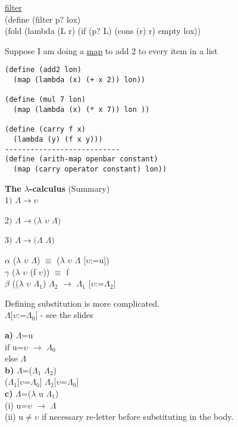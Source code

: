 \documentclass{article}
\begin{document}
\begin{flushleft}
\underline{filter}\\
(define (filter p? lox)\\
(fold (lambda (L r) (if (p? L) (cons (r) r) empty lox))\\
\end{flushleft}

\doublespacing
\begin{flushleft}
Suppose I am doing a \underline{map} to add 2 to every item in a list
\begin{verbatim}
(define (add2 lon)
  (map (lambda (x) (+ x 2)) lon))
  
(define (mul 7 lon)
  (map (lambda (x) (* x 7)) lon ))
  
(define (carry f x)
  (lambda (y) (f x y)))
---------------------------
(define (arith-map openbar constant)
  (map (carry operator constant) lon))
\end{verbatim}
\end{flushleft}

\begin{flushleft}
\textbf{The $\lambda$-calculus} (Summary)\\
$1)$ $\Lambda\rightarrow\upsilon$

$2)$ $\Lambda\rightarrow(\lambda$ 
$\upsilon$
$\Lambda)$

$3)$ $\Lambda\rightarrow(\Lambda$
$\Lambda)$
\end{flushleft}

\doublespacing
\begin{flushleft}
$\alpha$ ($\lambda$ $\upsilon$ $\Lambda$) $\equiv$ ($\lambda$ $\upsilon$ $\Lambda$ [$\upsilon$:=u])\\
$\gamma$ ($\lambda$ $\upsilon$ (f $\upsilon$)) $\equiv$ f\\
$\beta$ (($\lambda$ $\upsilon$ ${\Lambda}_{1}$) ${\Lambda}_{2}$ $\rightarrow$ ${\Lambda}_{1}$ [$\upsilon$:=${\Lambda}_{2}$]
\end{flushleft}

\begin{flushleft}
Defining substitution is more complicated.\\
$\Lambda$[$\upsilon$:=${\Lambda}_{0}$] - see the slides 
\end{flushleft}

\begin{flushleft}
\textbf{a)} $\Lambda$=u\\
if u=$\upsilon$ $\rightarrow$ ${\Lambda}_{0}$ \\
else $\Lambda$\\
\textbf{b)} $\Lambda$=(${\Lambda}_{1}$ ${\Lambda}_{2}$)\\
(${\Lambda}_{1}$[$\upsilon$=${\Lambda}_{0}$] ${\Lambda}_{2}$[$\upsilon$=${\Lambda}_{0}$]\\
\textbf{c)} $\Lambda$=($\lambda$ u ${\Lambda}_{1}$)\\
(i) u=$\upsilon$ $\rightarrow$ $\Lambda$\\
(ii) u$\neq\upsilon$ if necessary re-letter before substituting in the body.
\end{flushleft}
\end{document}
